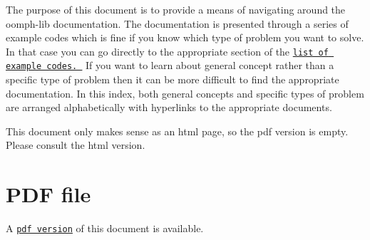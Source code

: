 The purpose of this document is to provide a means of navigating around the {\ttfamily oomph-\/lib} documentation. The documentation is presented through a series of example codes which is fine if you know which type of problem you want to solve. In that case you can go directly to the appropriate section of the \href{../../example_code_list/html/index.html}{\tt list of example codes. } If you want to learn about general concept rather than a specific type of problem then it can be more difficult to find the appropriate documentation. In this index, both general concepts and specific types of problem are arranged alphabetically with hyperlinks to the appropriate documents. ~\newline
~\newline
  
 
 This document only makes sense as an html page, so the pdf version is
 empty. Please consult the html version.

 



 

 \hypertarget{index_pdf}{}\section{P\+D\+F file}\label{index_pdf}
A \href{../latex/refman.pdf}{\tt pdf version} of this document is available. 
